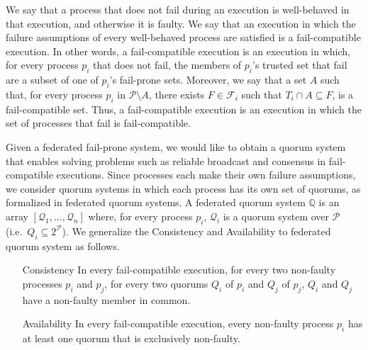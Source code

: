 \documentclass[11pt,letterpaper]{article}
\begin{document}
We say that a process that does not fail during an execution is well-behaved in that execution, and otherwise it is faulty.
We say that an execution in which the failure assumptions of every well-behaved process are satisfied is a fail-compatible execution.
In other words, a fail-compatible execution is an execution in which, for every process $p_i$ that does not fail, the members of $p_i$'s trusted set that fail are a subset of one of $p_i$'s fail-prone sets.
Moreover, we say that a set $A$ such that, for every process $p_i$ in $\mathcal{P}\setminus A$, there exists $F\in\mathcal{F}_i$ such that $T_i\cap A \subseteq F$, is a fail-compatible set.
Thus, a fail-compatible execution is an execution in which the set of processes that fail is fail-compatible.

Given a federated fail-prone system, we would like to obtain a quorum system that enables solving problems such as reliable broadcast and consensus in fail-compatible executions.
Since processes each make their own failure assumptions, we consider quorum systems in which each process has its own set of quorums, as formalized in federated quorum systems.
A federated quorum system $\mathbb{Q}$ is an array $\left[\mathcal{Q}_1,...,\mathcal{Q}_n\right]$ where, for every process $p_i$, $\mathcal{Q}_i$ is a quorum system over $\mathcal{P}$ (i.e.\ $Q_i\subseteq 2^{\mathcal{P}}$).
We generalize the Consistency and Availability to federated quorum system as follows. %
\begin{itemize}
  \item[Consistency] In every fail-compatible execution, for every two non-faulty processes $p_i$ and $p_j$, for every two quorums $Q_i$ of $p_i$ and $Q_j$ of $p_j$, $Q_i$ and $Q_j$ have a non-faulty member in common.
  \item[Availability] In every fail-compatible execution, every non-faulty process $p_i$  has at least one quorum that is exclusively non-faulty.
\end{itemize}
\end{document}
